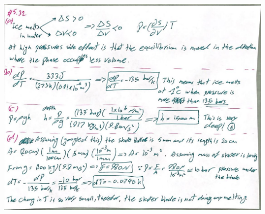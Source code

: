 \documentclass[fleqn]{article}
\begin{document}
\begin{enumerate}
\begin{enumerate}
    \end{enumerate}

    \begin{center}
      \includegraphics[height=14cm, width=17cm]{532.JPG}
    \end{center}


  \end{enumerate}
\end{document}
